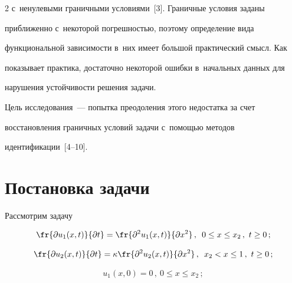\begin{multicols}{2}
с~ненулевыми граничными условиями~[3]. Граничные условия заданы 

приближенно с~некоторой погрешностью, поэтому определение вида 

функциональной зависимости в~них имеет большой практический смысл. Как 

показывает практика, достаточно некоторой ошибки в~начальных данных для 

нарушения устойчивости решения задачи.

  

  Цель исследования~--- попытка преодоления этого недостатка за счет 

восстановления граничных условий задачи с~помощью методов 

идентификации~[4--10].



\vspace*{-6pt}





\section{Постановка задачи}



  Рассмотрим задачу

  \begin{equation}

  \fr{\partial u_1(x,t)}{\partial t} =\fr{\partial^2 u_1(x,t)}{\partial x^2}\,,\enskip 

0\leq x\leq x_2\,,\ t\geq0\,;\label{e1-sr}

  \end{equation}

  \begin{equation}

  \fr{\partial u_2(x,t)}{\partial t} =\kappa\fr{\partial^2 u_2(x,t)}{\partial 

x^2}\,,\enskip x_2<x\leq 1\,,\ t\geq 0\,;\label{e2-sr}

  \end{equation}

  \begin{equation}

  u_1(x,0)=0\,,\ 0\leq x\leq x_2\,;\label{e3-sr}

  \end{equation}

  \begin{equation}


\end{equation}
\end{multicols}
